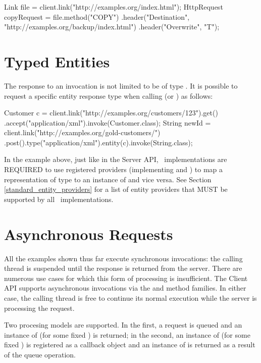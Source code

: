 \begin{listing}{1}
Link file = client.link("http://examples.org/index.html");
HttpRequest copyRequest = file.method("COPY") 
    .header("Destination", "http://examples.org/backup/index.html")
    .header("Overwrite", "T");
\end{listing}

\section{Typed Entities}

The response to an invocation is not limited to be of type \HttpResponse. It is possible to request a specific entity response type when calling  (or ) as follows:

\begin{listing}{1}
Customer c = client.link("http://examples.org/customers/123").get()
    .accept("application/xml").invoke(Customer.class);
String newId = client.link("http://examples.org/gold-customers/")
    .post().type("application/xml").entity(c).invoke(String.class);
\end{listing}

In the example above, just like in the Server API, \jaxrs\ implementations are REQUIRED to use registered providers (implementing  and ) to map a representation of type  to an instance of  and vice versa. See Section \ref{standard_entity_providers} for a list of entity providers that MUST be supported by all \jaxrs\ implementations.

\section{Asynchronous Requests}

All the examples shown thus far execute synchronous invocations: the calling thread is suspended until the response is returned from the server. There are numerous use cases for which this form of processing is insufficient. The Client API supports asynchronous invocations via the  and  method families. In either case, the calling thread is free to continue its normal execution while the server is processing the request. 

Two procesing models are supported. In the first, a request is queued and an instance of  (for some fixed ) is returned; in the second, an instance of  (for some fixed ) is registered as a callback object and an instance of  is returned as a result of the queue operation.

